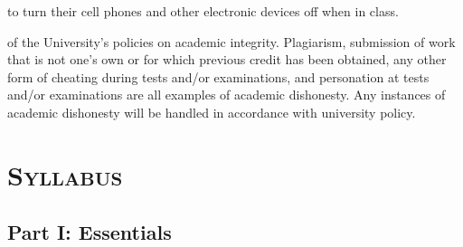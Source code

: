 \documentclass{tufte-handout} %
\begin{document}
 to turn their cell phones and other electronic devices off when in class.


 of the University's policies on academic integrity. Plagiarism, submission of work that is not one's own or for which previous credit has been obtained, any other form of cheating during tests and/or examinations, and personation at tests and/or examinations are all examples of academic dishonesty. Any instances of academic dishonesty will be handled in accordance with university policy.

\newpage
\section{\textsc{Syllabus}}

\subsection{Part I: Essentials}
\end{document}
